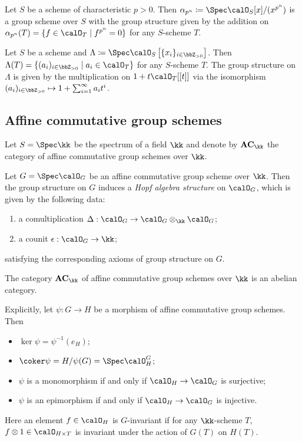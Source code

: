 \begin{example}
	Let $S$ be a scheme of characteristic $p>0$.
	Then $\alpha_{p^n} \coloneqq \Spec \calO_S[x]/(x^{p^n})$ is a group scheme over $S$ with the group structure given by the addition on $\alpha_{p^n}(T) = \{ f \in \calO_T \mid f^{p^n} = 0 \}$ for any $S$-scheme $T$.
\end{example}

\begin{example}
	Let $S$ be a scheme and $\Lambda \coloneqq \Spec \calO_S\left[\{x_i\}_{i \in \bbZ_{>0}}\right]$.
	Then $\Lambda(T) = \{ (a_i)_{i \in \bbZ_{>0}} \mid a_i \in \calO_T\}$ for any $S$-scheme $T$.
	The group structure on $\Lambda$ is given by the multiplication on $1 + t \calO_T[[t]]$ via the isomorphism $(a_i)_{i \in \bbZ_{>0}} \mapsto 1 + \sum_{i=1}^{\infty} a_i t^i$.
\end{example}


\subsection{Affine commutative group schemes}

Let $S = \Spec \kk$ be the spectrum of a field $\kk$ and denote by $\mathbf{AC}_\kk$ the category of affine commutative group schemes over $\kk$.

Let $G = \Spec \calO_G$ be an affine commutative group scheme over $\kk$.
Then the group structure on $G$ induces a \emph{Hopf algebra structure} on $\calO_G$, which is given by the following data:
\begin{enumerate}
	\item a comultiplication $\Delta: \calO_G \to \calO_G \otimes_\kk \calO_G$;
	\item a counit $\epsilon: \calO_G \to \kk$;
\end{enumerate}
satisfying the corresponding axioms of group structure on $G$.

\begin{theorem}[Grothendieck]
	The category $\mathbf{AC}_\kk$ of affine commutative group schemes over $\kk$ is an abelian category.
\end{theorem}

Explicitly, let $\psi: G \to H$ be a morphism of affine commutative group schemes.
Then
\begin{itemize}
	\item $\ker \psi = \psi^{-1}(e_H)$;
	\item $\coker \psi = H / \psi(G) = \Spec \calO_H^{G}$;
	\item $\psi$ is a monomorphism if and only if $\calO_H \to \calO_G$ is surjective;
	\item $\psi$ is an epimorphism if and only if $\calO_H \to \calO_G$ is injective.
\end{itemize}
Here an element $f \in \calO_H$ is $G$-invariant if for any $\kk$-scheme $T$, $f \otimes 1 \in \calO_{H \times T}$ is invariant under the action of $G(T)$ on $H(T)$.

